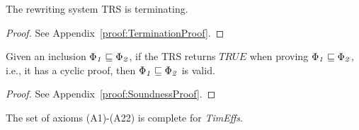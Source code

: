 \documentclass[acmsmall,10pt,review]{acmart}
\newcommand{\timedEffects}{\emph{TimEffs}}
\newcommand{\effect}{\textcolor{black}{\ensuremath{\mathrm{\Phi}}}}
\newcommand{\code}[1]{{\tt{\ensuremath{\m{#1}}}}}
\newcommand{\CONTAIN}{\sqsubseteq}
\newcommand{\m}{\mathit}
\newcommand\appref[1]{Appendix~\textcolor{blue}{\ref{#1}}}
\begin{document}






 
\begin{theorem}[Termination]\label{termination}
The rewriting system TRS is terminating.
\end{theorem}
\begin{proof}
See %
\appref{proof:TerminationProof}.
\end{proof}

 \begin{theorem}[Soundness]\label{Cyclicsoundness}
Given an inclusion \code{\effect_1 \CONTAIN \effect_2}, if the TRS returns \code{TRUE} when proving \code{\effect_1 \CONTAIN \effect_2}, i.e., it has a cyclic proof, 
then \code{\effect_1 \CONTAIN \effect_2} is valid.
\end{theorem}


\begin{proof}
See %
\appref{proof:SoundnessProof}.
\end{proof}


%


 \begin{theorem}[Completeness]\label{Completeness}
 The set of axioms (A1)-(A22) is complete for \timedEffects.


\end{theorem}
\end{document}
